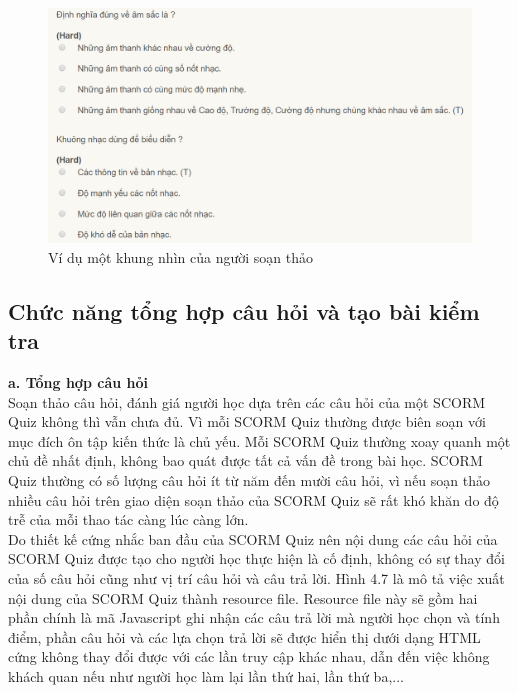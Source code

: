 	
	\begin{center}
		\begin{figure}[htp]
			\begin{center}
			\includegraphics[width=15cm]{Chapter4/Pictures/picture46.png}
			\end{center}
			\caption{Ví dụ một khung nhìn của người soạn thảo}
			\label{refpicture52}
		\end{figure}
	\end{center}	

	\newpage
		
	\subsection{Chức năng tổng hợp câu hỏi và tạo bài kiểm tra}
	\textbf{a.	Tổng hợp câu hỏi}\\
	
		Soạn thảo câu hỏi, đánh giá người học dựa trên các câu hỏi của một SCORM Quiz không thì vẫn chưa đủ. Vì mỗi SCORM Quiz thường được biên soạn với mục đích ôn tập kiến thức là chủ yếu. Mỗi SCORM Quiz thường xoay quanh một chủ đề nhất định, không bao quát được tất cả vấn đề trong bài học. SCORM Quiz thường có số lượng câu hỏi ít từ năm đến mười câu hỏi, vì nếu soạn thảo nhiều câu hỏi trên giao diện soạn thảo của SCORM Quiz sẽ rất khó khăn do độ trễ của mỗi thao tác càng lúc càng lớn.\\
		
		Do thiết kế cứng nhắc ban đầu của SCORM Quiz nên nội dung các câu hỏi của SCORM Quiz được tạo cho người học thực hiện là cố định, không có sự thay đổi của số câu hỏi cũng như vị trí câu hỏi và câu trả lời. Hình 4.7 là mô tả việc xuất nội dung của SCORM Quiz thành resource file. Resource file này sẽ gồm hai phần chính là mã Javascript ghi nhận các câu trả lời mà người học chọn và tính điểm, phần câu hỏi và các lựa chọn trả lời sẽ được hiển thị dưới dạng HTML cứng không thay đổi được với các lần truy cập khác nhau, dẫn đến việc không khách quan nếu như người học làm lại lần thứ hai, lần thứ ba,...\\
	
